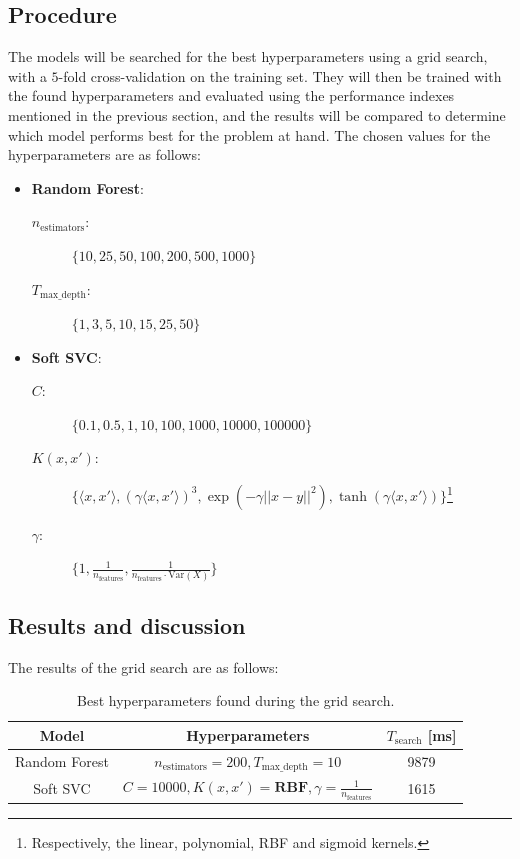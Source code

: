 \documentclass{article}
\begin{document}
\subsection{Procedure}
The models will be searched for the best hyperparameters using a grid search, with a $5$-fold cross-validation on the training set.
They will then be trained with the found hyperparameters and evaluated using the performance indexes mentioned in the previous section, and the results will be compared to determine which model performs best for the problem at hand.
The chosen values for the hyperparameters are as follows:
\begin{itemize}
    \item \textbf{Random Forest}: 
    \begin{description}
        \item[$n_{\text{estimators}}$:] $\{10, 25, 50, 100, 200, 500, 1000\}$
        \item[$T_{\text{max\_depth}}$:] $\{1, 3, 5, 10, 15, 25, 50\}$
    \end{description}
    \item \textbf{Soft SVC}: 
    \begin{description}
        \item[$C$:] $\{0.1, 0.5, 1, 10, 100, 1000, 10000, 100000\}$
        \item[$K(x, x')$:] $\{\langle x, x' \rangle, (\gamma \langle x, x' \rangle)^3, \exp(-\gamma ||x-y||^2), \tanh(\gamma\langle x, x' \rangle)\}$\footnote{Respectively, the linear, polynomial, RBF and sigmoid kernels.}
        \item[$\gamma$:] $\{1, \frac{1}{n_{\text{features}}}, \frac{1}{n_{\text{features}} \cdot \text{Var}(X)}\}$
    \end{description}
\end{itemize}

\newpage


\subsection{Results and discussion}
The results of the grid search are as follows:

\begin{table}[h]
    \centering
    \begin{tabular}{c|c|c}
        \toprule
        Model & Hyperparameters & $T_{\text{search}}$ [ms] \\
        \midrule
        Random Forest & $n_{\text{estimators}} = 200, T_{\text{max\_depth}} = 10$ & 9879 \\
        Soft SVC & $C = 10000, K(x, x') = \textbf{RBF}, \gamma = \frac{1}{n_{\text{features}}}$ & 1615 \\
        \bottomrule
    \end{tabular}
    \caption{
        Best hyperparameters found during the grid search.
    }
    \label{tab:hyperparameters}
\end{table}
\end{document}
